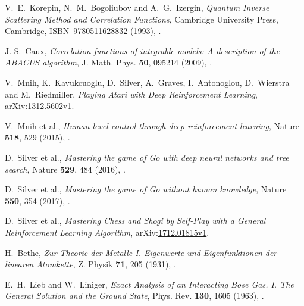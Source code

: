 \documentclass[11pt, a4paper]{report} %
\begin{document}
\begin{thebibliography}{99}


V.~E.~Korepin, N.~M.~Bogoliubov and A.~G.~Izergin, \textit{Quantum Inverse Scattering Method and Correlation Functions}, Cambridge University Press, Cambridge, ISBN~9780511628832 (1993), .




J.-S.~Caux, \textit{Correlation functions of integrable models: A description of the ABACUS algorithm}, J. Math. Phys. \textbf{50}, 095214 (2009), .




V.~Mnih, K.~Kavukcuoglu, D.~Silver, A.~Graves, I.~Antonoglou, D.~Wierstra and M.~Riedmiller, \textit{Playing Atari with Deep Reinforcement Learning}, arXiv:\href{https://arxiv.org/abs/1312.5602v1}{1312.5602v1}. 




V.~Mnih et al., \textit{Human-level control through deep reinforcement learning}, Nature \textbf{518}, 529 (2015), .




D.~Silver et al., \textit{Mastering the game of Go with deep neural networks and tree search}, Nature \textbf{529}, 484 (2016), .




D.~Silver et al., \textit{Mastering the game of Go without human knowledge}, Nature \textbf{550}, 354 (2017), .




D.~Silver et al., \textit{Mastering Chess and Shogi by Self-Play with a General Reinforcement Learning Algorithm}, arXiv:\href{https://arxiv.org/abs/1712.01815v1}{1712.01815v1}. 




H.~Bethe, \textit{Zur Theorie der Metalle I. Eigenwerte und Eigenfunktionen der linearen Atomkette}, Z. Physik \textbf{71}, 205 (1931), .




E.~H.~Lieb and W.~Liniger, \textit{Exact Analysis of an Interacting Bose Gas. I. The General Solution and the Ground State}, Phys. Rev. \textbf{130}, 1605 (1963), .





\end{thebibliography}
\end{document}
